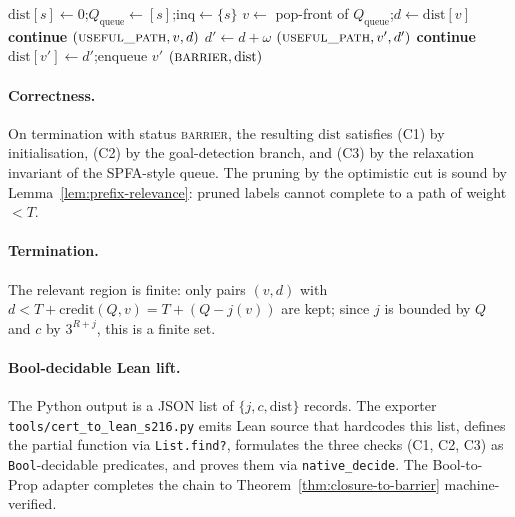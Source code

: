 \documentclass[11pt,a4paper]{article}
\theoremstyle{plain}
\theoremstyle{definition}
\newcommand{\credit}{\mathrm{credit}}
\begin{document}
\begin{algorithm}[H]
\caption{S216 BF closure with optimistic credit
         (\texttt{tools/s216\_engine.py})}
\label{alg:s216-bf}
\begin{algorithmic}[1]
\State $\mathrm{dist}[s] \gets 0$;\quad $Q_{\mathrm{queue}} \gets [s]$;\quad $\mathrm{inq} \gets \{s\}$
  \State $v \gets$ pop-front of $Q_{\mathrm{queue}}$;\quad $d \gets \mathrm{dist}[v]$
    \State \textbf{continue}    
  \EndIf
    \State \Return $(\textsc{useful\_path}, v, d)$
  \EndIf
    \State $d' \gets d + \omega$
      \State \Return $(\textsc{useful\_path}, v', d')$
    \EndIf
      \State \textbf{continue}    
    \EndIf
      \State $\mathrm{dist}[v'] \gets d'$;\quad enqueue $v'$
    \EndIf
  \EndFor
\EndWhile
\State \Return $(\textsc{barrier}, \mathrm{dist})$    
\end{algorithmic}
\end{algorithm}

\paragraph{Correctness.}
On termination with status \textsc{barrier}, the resulting
$\mathrm{dist}$ satisfies (C1) by initialisation, (C2) by the
goal-detection branch, and (C3) by the relaxation invariant of the
SPFA-style queue. The pruning by the optimistic cut is sound by
Lemma~\ref{lem:prefix-relevance}: pruned labels cannot complete to a
path of weight $< T$.

\paragraph{Termination.}
The relevant region is finite: only pairs $(v, d)$ with
$d < T + \credit(Q, v) = T + (Q - j(v))$ are kept; since $j$ is
bounded by $Q$ and $c$ by $3^{R + j}$, this is a finite set.

\paragraph{Bool-decidable Lean lift.}
The Python output is a JSON list of
$\{j, c, \mathrm{dist}\}$ records. The exporter
\texttt{tools/cert\_to\_lean\_s216.py} emits Lean source that
hardcodes this list, defines the partial function via
\texttt{List.find?}, formulates the three checks (C1, C2, C3) as
\texttt{Bool}-decidable predicates, and proves them via
\texttt{native\_decide}. The Bool-to-Prop adapter completes the
chain to Theorem~\ref{thm:closure-to-barrier} machine-verified.
\end{document}
